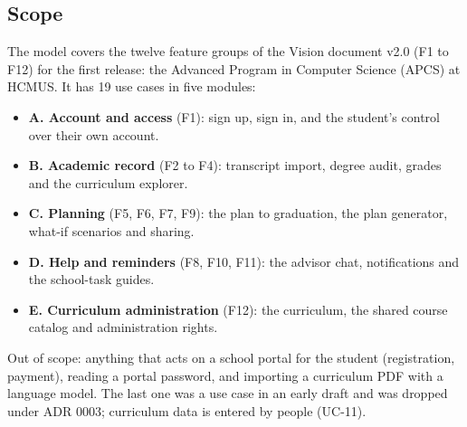 \documentclass{article}
\begin{document}
\subsection{Scope}
The model covers the twelve feature groups of the Vision document v2.0 (F1 to F12) for the first release: the Advanced
Program in Computer Science (APCS) at HCMUS. It has 19 use cases in five modules:

\begin{itemize}
  \item \textbf{A. Account and access} (F1): sign up, sign in, and the student's control over their own account.
  \item \textbf{B. Academic record} (F2 to F4): transcript import, degree audit, grades and the curriculum explorer.
  \item \textbf{C. Planning} (F5, F6, F7, F9): the plan to graduation, the plan generator, what-if scenarios and sharing.
  \item \textbf{D. Help and reminders} (F8, F10, F11): the advisor chat, notifications and the school-task guides.
  \item \textbf{E. Curriculum administration} (F12): the curriculum, the shared course catalog and administration rights.
\end{itemize}

Out of scope: anything that acts on a school portal for the student (registration, payment), reading a portal password,
and importing a curriculum PDF with a language model. The last one was a use case in an early draft and was dropped
under ADR 0003; curriculum data is entered by people (UC-11).
\end{document}
